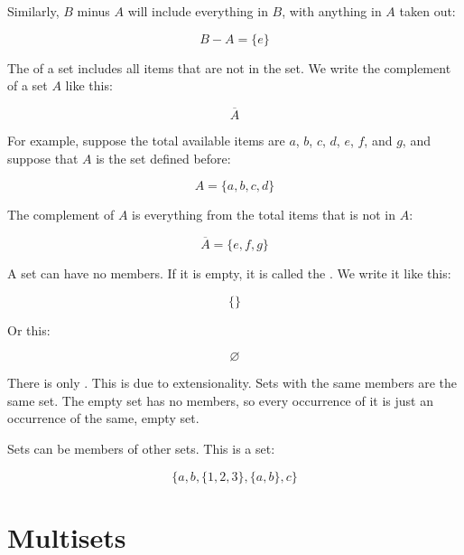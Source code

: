 \documentclass[../../../main.tex]{subfiles}
\begin{document}
\noindent
Similarly, $B$ minus $A$ will include everything in $B$, with anything in $A$ taken out:

\begin{equation*}
  B - A = \{ e \}
\end{equation*}

\noindent
The  of a set includes all items that are not in the set. We write the complement of a set $A$ like this:

\begin{equation*}
  \overline{A}
\end{equation*}

\noindent
For example, suppose the total available items are $a$, $b$, $c$, $d$, $e$, $f$, and $g$, and suppose that $A$ is the set defined before:

\begin{equation*}
  A = \{ a, b, c, d \}
\end{equation*}

\noindent
The complement of $A$ is everything from the total items that is not in $A$:

\begin{equation*}
  \overline{A} = \{ e, f, g \}
\end{equation*}

\noindent
A set can have no members. If it is empty, it is called the . We write it like this:

\begin{equation*}
\{ \}
\end{equation*}

\noindent
Or this:

\begin{equation*}
\varnothing
\end{equation*}

\noindent
There is only . This is due to extensionality. Sets with the same members are the same set. The empty set has no members, so every occurrence of it is just an occurrence of the same, empty set.

Sets can be members of other sets. This is a set:

\begin{equation*}
\{ a, b, \{ 1, 2, 3 \}, \{ a, b \}, c \}
\end{equation*}


\section{Multisets}
\end{document}
